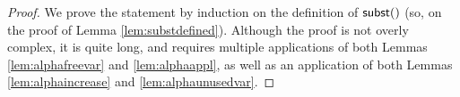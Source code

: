 \documentclass{lmcs}
\theoremstyle{theorem}\newtheorem{theorem}{Theorem}
\theoremstyle{theorem}\newtheorem{lemma}[theorem]{Lemma}
\theoremstyle{theorem}\newtheorem{corollary}[theorem]{Corollary}
\theoremstyle{definition}\newtheorem{definition}[theorem]{Definition}
\theoremstyle{definition}\newtheorem{example}[theorem]{Example}
\newcommand{\M}{\mathcal{M}}
\newcommand{\domain}{\mathtt{dom}}
\newcommand{\identifier}[1]{\mathtt{#1}}
\newcommand{\afun}{\identifier{f}}
\newcommand{\avar}{x}
\newcommand{\bvar}{y}
\newcommand{\Avar}{X}
\newcommand{\meta}[2]{#1\langle#2\rangle}
\newcommand{\tuple}[2]{\llparenthesis #1,\dots,#2 \rrparenthesis}
\begin{document}
\begin{proof}
We prove the statement by induction on the definition of $\subrel$ (so, on the
proof of Lemma \ref{lem:substdefined}).
Although the proof is not overly complex, it is quite long, and requires
multiple applications of both Lemmas \ref{lem:alphafreevar} and
\ref{lem:alphaappl}, as well as an application of both Lemmas
\ref{lem:alphaincrease} and \ref{lem:alphaunusedvar}.

\end{proof}
\end{document}
